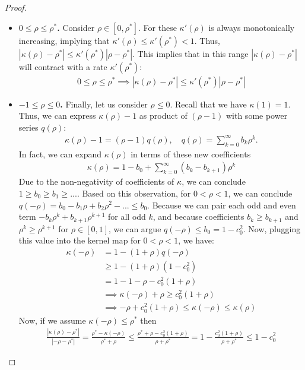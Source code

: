 \begin{proof}
\begin{itemize}
\item \textbf{$0\le \rho \le \rho^*$.}
Consider $\rho \in [0,\rho^*]$. For these $\kappa'(\rho)$ is always monotonically increasing, implying that $\kappa'(\rho)\le \kappa'(\rho^*) < 1$. Thus, $|\kappa(\rho)-\rho^*| \le \kappa'(\rho^*) |\rho - \rho^*|$. This implies that in this range $|\kappa(\rho)-\rho^*|$ will contract with a rate $\kappa'(\rho^*)$:
\begin{align*}
0\le \rho \le \rho^* \implies |\kappa(\rho) - \rho^*| \le \kappa'(\rho^*) |\rho-\rho^*|
\end{align*}

\item \textbf{$-1 \le \rho \le 0$.}
Finally, let us consider $\rho \le 0$. Recall that we have $\kappa(1) = 1$. Thus, we can express $\kappa(\rho)-1$ as product of $(\rho-1)$ with some power series $q(\rho)$:
\begin{align*}
\kappa(\rho) - 1 = (\rho-1)q(\rho), \quad q(\rho) = \sum_{k=0}^\infty b_k \rho^k.
\end{align*}
In fact, we can expand $\kappa(\rho)$ in terms of these new coefficients
\begin{align*}
\kappa(\rho) = 1-b_0 + \sum_{k=0}^\infty (b_k - b_{k+1}) \rho^k
\end{align*}
Due to the non-negativity of coefficients of $\kappa$, we can conclude $1\ge b_0 \ge b_1 \ge ...$. Based on this observation, for $0 < \rho < 1$, we can conclude
$q(-\rho) = b_0 - b_1 \rho + b_2 \rho^2 - ... \le b_0$. Because we can pair each odd and even term $-b_{k}\rho^k + b_{k+1} \rho^{k+1}$ for all odd $k$, and because coefficients $b_k \ge b_{k+1}$ and $\rho^{k} \ge \rho^{k+1}$ for $\rho \in [0,1]$, we can argue $q(-\rho) \le b_0 = 1 - c_0^2$. Now, plugging this value into the kernel map for $0 < \rho < 1$, we have:
\begin{align*}
\kappa(-\rho) &= 1 - (1+\rho)q(-\rho) \\
&\ge 1-(1+\rho)(1-c_0^2)\\
&= 1 - 1 - \rho - c_0^2 (1+\rho)\\
&\implies \kappa(-\rho) + \rho \ge c_0^2 (1+\rho)\\
&\implies -\rho + c_0^2(1+\rho) \le \kappa(-\rho) \le \kappa(\rho)
\end{align*}
Now, if we assume $\kappa(-\rho) \le \rho^*$ then
\begin{align*}
\frac{|\kappa(\rho)-\rho^*|}{|-\rho-\rho^*|}=\frac{\rho^* - \kappa(-\rho)}{\rho^* + \rho} \le \frac{\rho^* + \rho - c_0^2 (1+\rho)}{\rho+\rho^*} = 1- \frac{c_0^2(1+\rho)}{\rho+\rho^*} \le 1-c_0^2

\end{align*}
\end{itemize}
\end{proof}
